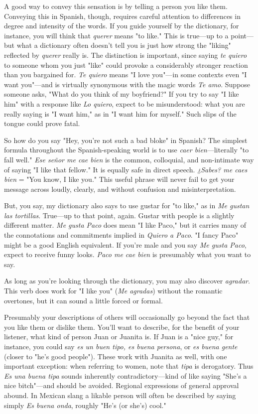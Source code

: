 \documentclass[14pt,a4paper,oneside]{memoir}
\begin{document}
A good way to convey this sensation is by telling a person you
like them. Conveying this in Spanish, though, requires careful attention to differences in degree and intensity of the words. If you guide
yourself by the dictionary, for instance, you will think that \emph{querer}
means "to like." This is true---up to a point---but what a dictionary
often doesn't tell you is just how strong the "liking" reflected by
\emph{querer} really is. The distinction is important, since saying \emph{te quiero} to
someone whom you just "like" could provoke a considerably stronger
reaction than you bargained for. \emph{Te quiero} means "I love you"---in
some contexts even "I want you"---and is virtually synonymous with
the magic words \emph{Te amo}. Suppose someone asks, "What do you think
of my boyfriend?" If you try to say "I like him" with a response like \emph{Lo
quiero}, expect to be misunderstood: what you are really saying is "I
want him," as in "I want him for myself." Such slips of the tongue
could prove fatal.

So how do you say "Hey, you're not such a bad bloke" in Spanish? The simplest formula throughout the Spanish-speaking world is to
use \emph{caer bien}---literally "to fall well." \emph{Ese señor me cae bien} is the common, colloquial, and non-intimate way of saying "I like that fellow." It
is equally safe in direct speech. \emph{¿Sabes? me caes bien} = "You know, I
like you." This useful phrase will never fail to get your message across
loudly, clearly, and without confusion and misinterpretation.

But, you say, my dictionary also says to use gustar for "to
like," as in \emph{Me gustan las tortillas}. True---up to that point, again. Gustar with people is a slightly different matter. \emph{Me gusta Paco} does mean
"I like Paco," but it carries many of the connotations and commitments implied in \emph{Quiero a Paco}. "I fancy Paco" might be a good English equivalent. If you're male and you say \emph{Me gusta Paco}, expect to
receive funny looks. \emph{Paco me cae bien} is presumably what you want
to say.

As long as you're looking through the dictionary, you may also
discover \emph{agradar}. This verb does work for "I like you" (\emph{Me agradas})
without the romantic overtones, but it can sound a little forced or
formal.

Presumably your descriptions of others will occasionally go
beyond the fact that you like them or dislike them. You'll want to
describe, for the benefit of your listener, what kind of person Juan or
Juanita is. If Juan is a "nice guy," for instance, you could say \emph{es un
buen tipo, es buena persona}, or \emph{es buena gente} (closer to "he's good
people"). These work with Juanita as well, with one important exception: when referring to women, note that \emph{tipa} is derogatory. Thus \emph{Es
una buena tipa} sounds inherently contradictory---kind of like saying
"She's a nice bitch"---and should be avoided. Regional expressions
of general approval abound. In Mexican slang a likable person will often be described by saying simply \emph{Es buena onda}, roughly "He's (or
she's) cool."
\end{document}
